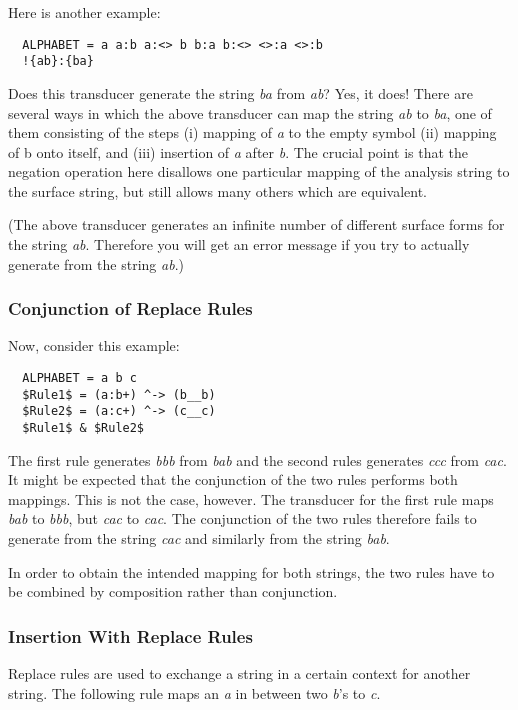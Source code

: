 \documentclass{article}
\begin{document}
Here is another example:
\begin{verbatim}
  ALPHABET = a a:b a:<> b b:a b:<> <>:a <>:b
  !{ab}:{ba}
\end{verbatim}
Does this transducer generate the string \emph{ba} from \emph{ab}?
Yes, it does! There are several ways in which the above transducer can
map the string \emph{ab} to \emph{ba}, one of them consisting of the
steps (i) mapping of \emph{a} to the empty symbol (ii) mapping of b
onto itself, and (iii) insertion of \emph{a} after \emph{b}.  The
crucial point is that the negation operation here disallows one
particular mapping of the analysis string to the surface string, but
still allows many others which are equivalent.

(The above transducer generates an infinite number of different
surface forms for the string \emph{ab}. Therefore you will get an
error message if you try to actually generate from the string
\emph{ab}.)


\subsubsection*{Conjunction of Replace Rules} 

Now, consider this example:
\begin{verbatim}
  ALPHABET = a b c
  $Rule1$ = (a:b+) ^-> (b__b)
  $Rule2$ = (a:c+) ^-> (c__c)
  $Rule1$ & $Rule2$
\end{verbatim}
The first rule generates \emph{bbb} from \emph{bab} and the second
rules generates \emph{ccc} from \emph{cac}. It might be expected that
the conjunction of the two rules performs both mappings. This is not
the case, however. The transducer for the first rule maps \emph{bab}
to \emph{bbb}, but \emph{cac} to \emph{cac}. The conjunction of the
two rules therefore fails to generate from the string \emph{cac} and
similarly from the string \emph{bab}. 

In order to obtain the intended mapping for both strings, the two
rules have to be combined by composition rather than conjunction.


\subsubsection*{Insertion With Replace Rules} 

Replace rules are used to exchange a string in a certain context for
another string. The following rule maps an \emph{a} in between two
\emph{b}'s to \emph{c}.
\end{document}
